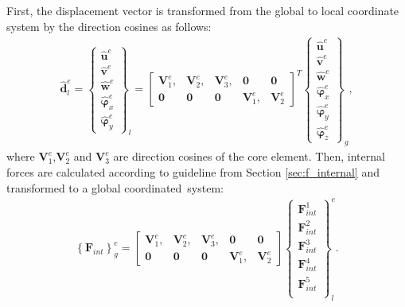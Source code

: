 First, the displacement vector is transformed from the global to local coordinate system by the direction cosines as follows:
\begin{eqnarray}
	\widehat{\textbf{d}}^e_l = \left \{\begin{array}{c}
		\widehat{\textbf{u}}^e \\ \widehat{\textbf{v}}^e \\
		\widehat{\textbf{w}}^e \\ \widehat{\boldsymbol{\varphi}}_x^e \\
		\widehat{\boldsymbol{\varphi}}_y^e
	\end{array}\right \}_l = 
	\left [\begin{array}{ccccc}
		\textbf{V}^e_1, & \textbf{V}^e_2, & \textbf{V}^e_3, & \textbf{0} & \textbf{0} \\
		\textbf{0} & \textbf{0} & \textbf{0} & \textbf{V}^e_1, & \textbf{V}^e_2
	\end{array}\right ]^T
	\left \{\begin{array}{c}
		\widehat{\textbf{u}}^e \\ \widehat{\textbf{v}}^e \\
		\widehat{\textbf{w}}^e \\ \widehat{\boldsymbol{\varphi}}_x^e \\
		\widehat{\boldsymbol{\varphi}}_y^e\\
		\widehat{\boldsymbol{\varphi}}_z^e
	\end{array}\right \}_g,
	\label{eq:d_local}
\end{eqnarray}
where \(\textbf{V}^e_1\),\(\textbf{V}^e_2\) and \(\textbf{V}^e_3\) are direction cosines of the core element. Then, internal forces are calculated according to guideline from Section \ref{sec:f_internal} and transformed to a global coordinated~system:
\begin{eqnarray}
	\left\{\textbf{F}_{int}\right\}^e_g =
	\left [\begin{array}{ccccc}
		\textbf{V}^e_1, & \textbf{V}^e_2, & \textbf{V}^e_3, & \textbf{0} & \textbf{0} \\
		\textbf{0} & \textbf{0} & \textbf{0} & \textbf{V}^e_1, & \textbf{V}^e_2
	\end{array}\right ]
	\left \{\begin{array}{c}
		\textbf{F}^1_{int} \\
		\textbf{F}^2_{int} \\
		\textbf{F}^3_{int} \\
		\textbf{F}^4_{int} \\
		\textbf{F}^5_{int} \\
	\end{array}\right \}_l^e.
	\label{eq:f_global}
\end{eqnarray}

